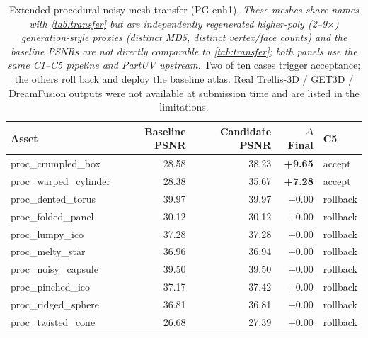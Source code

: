 \begin{table}[t]
\centering
\scriptsize
\caption{Extended procedural noisy mesh transfer (PG-enh1). \emph{These meshes share names with \cref{tab:transfer} but are independently regenerated higher-poly (2--9$\times$) generation-style proxies (distinct MD5, distinct vertex/face counts) and the baseline PSNRs are not directly comparable to \cref{tab:transfer}; both panels use the same C1--C5 pipeline and PartUV upstream.} Two of ten cases trigger acceptance; the others roll back and deploy the baseline atlas. Real Trellis-3D / GET3D / DreamFusion outputs were not available at submission time and are listed in the limitations.}
\label{tab:transfer_extended}
\begin{tabular}{@{}lrrrl@{}}
\toprule
Asset & Baseline PSNR & Candidate PSNR & $\Delta$Final & C5 \\
\midrule
proc\_crumpled\_box & 28.58 & 38.23 & \textbf{+9.65} & accept \\
proc\_warped\_cylinder & 28.38 & 35.67 & \textbf{+7.28} & accept \\
proc\_dented\_torus & 39.97 & 39.97 & +0.00 & rollback \\
proc\_folded\_panel & 30.12 & 30.12 & +0.00 & rollback \\
proc\_lumpy\_ico & 37.28 & 37.28 & +0.00 & rollback \\
proc\_melty\_star & 36.96 & 36.94 & +0.00 & rollback \\
proc\_noisy\_capsule & 39.50 & 39.50 & +0.00 & rollback \\
proc\_pinched\_ico & 37.17 & 37.42 & +0.00 & rollback \\
proc\_ridged\_sphere & 36.81 & 36.81 & +0.00 & rollback \\
proc\_twisted\_cone & 26.68 & 27.39 & +0.00 & rollback \\
\bottomrule
\end{tabular}
\end{table}
